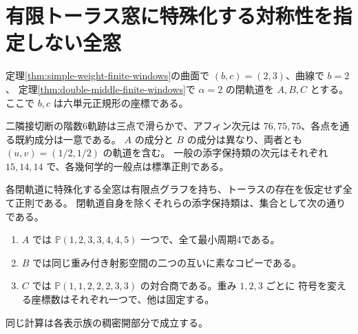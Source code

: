 \section{有限トーラス窓に特殊化する対称性を指定しない全窓}
\label{sec:finite-torus-slices}
定理\ref{thm:simple-weight-finite-windows}の曲面で $(b,c)=(2,3)$、曲線で $b=2$、
定理\ref{thm:double-middle-finite-windows}で $\alpha=2$ の閉軌道を $A,B,C$ とする。
ここで $b,c$ は六単元正規形の座標である。
\begin{theorem}\label{thm:finite-torus-slices}
二隣接切断の階数6軌跡は三点で滑らかで、アフィン次元は $76,75,75$、各点を通る既約成分は一意である。
$A$ の成分と $B$ の成分は異なり、両者とも $(u,v)=(1/2,1/2)$ の軌道を含む。
一般の添字保持類の次元はそれぞれ $15,14,14$ で、各幾何学的一般点は標準正則である。

各閉軌道に特殊化する全窓は有限点グラフを持ち、トーラスの存在を仮定せず全て正則である。
閉軌道自身を除くそれらの添字保持類は、集合として次の通りである。
\begin{enumerate}
\item $A$ では $\mathbb P(1,2,3,3,4,4,5)$ 一つで、全て最小周期4である。
\item $B$ では同じ重み付き射影空間の二つの互いに素なコピーである。
\item $C$ では $\mathbb P(1,1,2,2,2,3,3)$ の対合商である。重み $1,2,3$ ごとに
符号を変える座標数はそれぞれ一つで、他は固定する。
\end{enumerate}
同じ計算は各表示族の稠密開部分で成立する。
\end{theorem}
